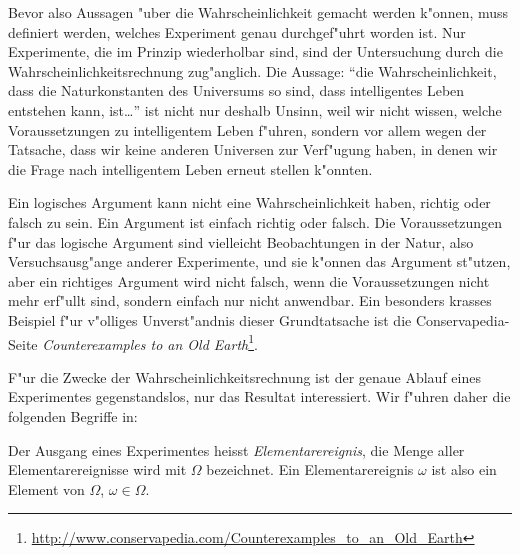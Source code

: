 Bevor also Aussagen "uber die Wahrscheinlichkeit gemacht werden k"onnen,
muss definiert werden, welches Experiment genau durchgef"uhrt worden ist.
Nur Experimente, die im Prinzip wiederholbar sind, sind der Untersuchung
durch die Wahrscheinlichkeitsrechnung zug"anglich.
Die Aussage: ``die Wahrscheinlichkeit, dass die Naturkonstanten des
Universums so sind, dass intelligentes Leben entstehen kann, ist\dots''
ist nicht nur deshalb Unsinn, weil wir nicht wissen, welche
Voraussetzungen zu intelligentem Leben f"uhren, sondern vor allem wegen
der Tatsache, dass wir keine anderen Universen zur Verf"ugung haben, in denen
wir die Frage nach intelligentem Leben erneut stellen k"onnten.

Ein logisches Argument kann nicht eine Wahrscheinlichkeit haben,
richtig oder falsch zu sein.
Ein Argument ist einfach richtig oder falsch.
Die Voraussetzungen f"ur das logische Argument sind vielleicht Beobachtungen
in der Natur, also Versuchsausg"ange anderer Experimente, und sie
k"onnen das Argument st"utzen, aber ein richtiges Argument wird nicht
falsch, wenn die Voraussetzungen nicht mehr erf"ullt sind, sondern einfach
nur nicht anwendbar.
Ein besonders krasses Beispiel f"ur v"olliges Unverst"andnis
dieser Grundtatsache ist die Conservapedia-Seite {\em Counterexamples
to an Old Earth}\footnote{\url{http://www.conservapedia.com/Counterexamples\_to\_an\_Old\_Earth}}.

F"ur die Zwecke der Wahrscheinlichkeitsrechnung ist der genaue Ablauf
eines Experimentes gegenstandslos, nur das Resultat interessiert.
Wir f"uhren daher die folgenden Begriffe in:

\begin{definition}
Der Ausgang eines Experimentes heisst {\em Elementarereignis}, die
Menge aller Elementarereignisse wird mit $\Omega$ bezeichnet.
Ein Elementarereignis $\omega$ ist also ein Element von $\Omega$,
$\omega\in\Omega$.
\end{definition}

